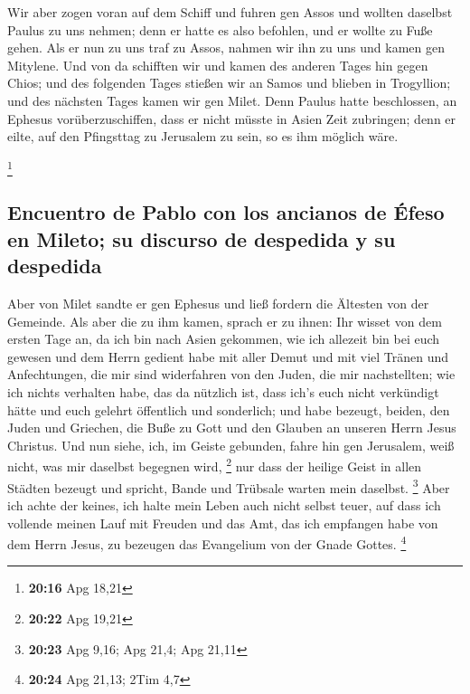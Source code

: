  Wir aber zogen voran auf dem Schiff und fuhren gen Assos
und wollten daselbst Paulus zu uns nehmen; denn er hatte es also
befohlen, und er wollte zu Fuße gehen.  Als er nun zu uns
traf zu Assos, nahmen wir ihn zu uns und kamen gen Mitylene.
 Und von da schifften wir und kamen des anderen Tages hin
gegen Chios; und des folgenden Tages stießen wir an Samos und blieben in
Trogyllion; und des nächsten Tages kamen wir gen Milet. 
Denn Paulus hatte beschlossen, an Ephesus vorüberzuschiffen, dass er
nicht müsste in Asien Zeit zubringen; denn er eilte, auf den Pfingsttag
zu Jerusalem zu sein, so es ihm möglich wäre.

\footnote{\textbf{20:16} Apg 18,21}

\hypertarget{encuentro-de-pablo-con-los-ancianos-de-uxe9feso-en-mileto-su-discurso-de-despedida-y-su-despedida}{%
\subsection{Encuentro de Pablo con los ancianos de Éfeso en Mileto; su
discurso de despedida y su
despedida}\label{encuentro-de-pablo-con-los-ancianos-de-uxe9feso-en-mileto-su-discurso-de-despedida-y-su-despedida}}

 Aber von Milet sandte er gen Ephesus und ließ fordern
die Ältesten von der Gemeinde.  Als aber die zu ihm
kamen, sprach er zu ihnen: Ihr wisset von dem ersten Tage an, da ich bin
nach Asien gekommen, wie ich allezeit bin bei euch gewesen
 und dem Herrn gedient habe mit aller Demut und mit viel
Tränen und Anfechtungen, die mir sind widerfahren von den Juden, die mir
nachstellten;  wie ich nichts verhalten habe, das da
nützlich ist, dass ich's euch nicht verkündigt hätte und euch gelehrt
öffentlich und sonderlich;  und habe bezeugt, beiden, den
Juden und Griechen, die Buße zu Gott und den Glauben an unseren Herrn
Jesus Christus.  Und nun siehe, ich, im Geiste gebunden,
fahre hin gen Jerusalem, weiß nicht, was mir daselbst begegnen wird,
\footnote{\textbf{20:22} Apg 19,21}  nur dass der heilige
Geist in allen Städten bezeugt und spricht, Bande und Trübsale warten
mein daselbst. \footnote{\textbf{20:23} Apg 9,16; Apg 21,4; Apg 21,11}
 Aber ich achte der keines, ich halte mein Leben auch
nicht selbst teuer, auf dass ich vollende meinen Lauf mit Freuden und
das Amt, das ich empfangen habe von dem Herrn Jesus, zu bezeugen das
Evangelium von der Gnade Gottes. \footnote{\textbf{20:24} Apg 21,13;
  2Tim 4,7}

